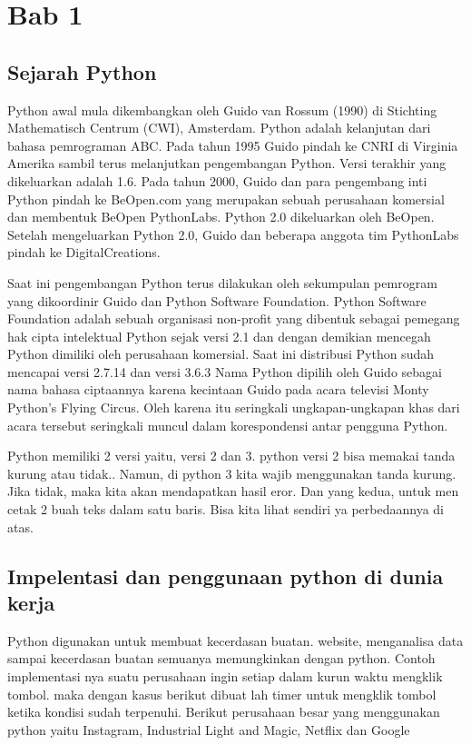 \chapter{Bab 1}

\section{Sejarah Python}

	Python awal mula dikembangkan oleh Guido van Rossum (1990) di Stichting Mathematisch Centrum (CWI), Amsterdam. Python adalah kelanjutan dari bahasa pemrograman ABC. Pada tahun 1995 Guido pindah ke CNRI di Virginia Amerika sambil terus melanjutkan pengembangan Python. Versi terakhir yang dikeluarkan adalah 1.6. Pada tahun 2000, Guido dan para pengembang inti Python pindah ke BeOpen.com yang merupakan sebuah perusahaan komersial dan membentuk BeOpen PythonLabs. Python 2.0 dikeluarkan oleh BeOpen. Setelah mengeluarkan Python 2.0, Guido dan beberapa anggota tim PythonLabs pindah ke DigitalCreations.
 
	Saat ini pengembangan Python terus dilakukan oleh sekumpulan pemrogram yang dikoordinir Guido dan Python Software Foundation. Python Software Foundation adalah sebuah organisasi non-profit yang dibentuk sebagai pemegang hak cipta intelektual Python sejak versi 2.1 dan dengan demikian mencegah Python dimiliki oleh perusahaan komersial. Saat ini distribusi Python sudah mencapai versi 2.7.14 dan versi 3.6.3 
Nama Python dipilih oleh Guido sebagai nama bahasa ciptaannya karena kecintaan Guido pada acara televisi Monty Python's Flying Circus. Oleh karena itu seringkali ungkapan-ungkapan khas dari acara tersebut seringkali muncul dalam korespondensi antar pengguna Python.

	Python memiliki 2 versi yaitu, versi 2 dan 3. python versi 2 bisa memakai tanda kurung atau tidak.. Namun, di python 3 kita wajib menggunakan tanda kurung. Jika tidak, maka kita akan mendapatkan hasil eror. Dan yang kedua, untuk men cetak 2 buah teks dalam satu baris. Bisa kita lihat sendiri ya perbedaannya di atas.


\section{Impelentasi dan penggunaan python di dunia kerja}

	Python digunakan untuk membuat kecerdasan buatan. website, menganalisa data sampai kecerdasan buatan semuanya memungkinkan dengan python. Contoh implementasi nya suatu perusahaan ingin setiap dalam kurun waktu mengklik tombol. maka dengan kasus berikut dibuat lah timer untuk mengklik tombol ketika kondisi sudah terpenuhi. Berikut perusahaan besar yang menggunakan python yaitu Instagram, Industrial Light and Magic, Netflix dan Google